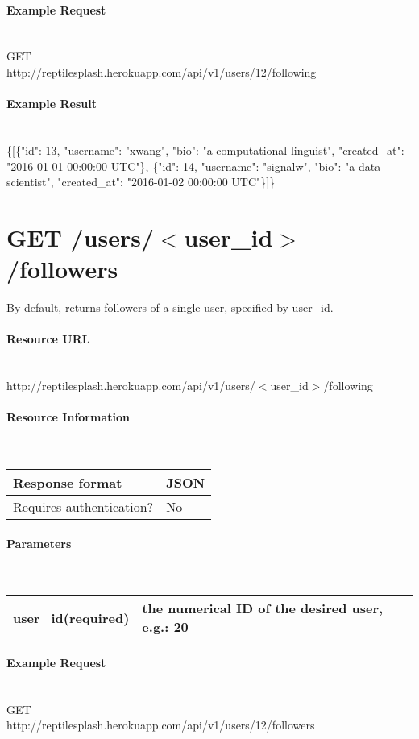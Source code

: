 \documentclass{article}
\begin{document}
	\paragraph{Example Request} \mbox{} \\
	GET \\
	http://reptilesplash.herokuapp.com/api/v1/users/12/following 
	\paragraph{Example Result} \mbox{} \\
	\{[\{"id": 13, "username": "xwang", "bio": "a computational linguist", "created\_at": "2016-01-01 00:00:00 UTC"\}, \{"id": 14, "username": "signalw", "bio": "a data scientist", "created\_at": "2016-01-02 00:00:00 UTC"\}]\}
	
	
	\section*{GET /users/$<$user\_id$>$/followers}
	By default, returns followers of a single user, specified by user\_id. 
	\paragraph{Resource URL} \mbox{} \\
	http://reptilesplash.herokuapp.com/api/v1/users/$<$user\_id$>$/following
	\paragraph{Resource Information} \mbox{} \\
	\begin{tabular}{ll}
		\hline
		Response format & JSON \\ \hline
		Requires authentication? & No \\ \hline
	\end{tabular}
	\paragraph{Parameters} \mbox{} \\
	\begin{tabular}{ll}
		\hline
		user\_id(required) & the numerical ID of the desired user, e.g.: 20 \\ \hline
	\end{tabular}
	\paragraph{Example Request} \mbox{} \\
	GET \\
	http://reptilesplash.herokuapp.com/api/v1/users/12/followers 
\end{document}
